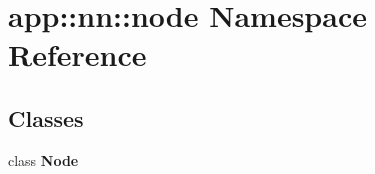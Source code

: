 \section{app::nn::node Namespace Reference}
\label{namespaceapp_1_1nn_1_1node}


\subsection*{Classes}
\begin{CompactItemize}
\item 
class {\bf Node}
\end{CompactItemize}
